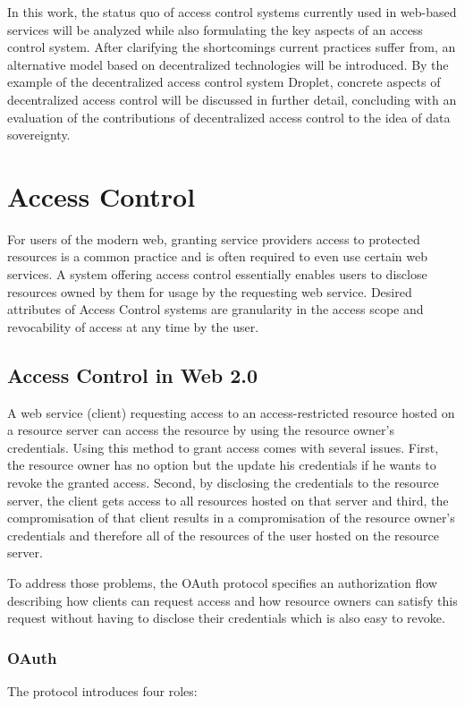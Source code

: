 \documentclass[conference]{IEEEtran}
\begin{document}
In this work, the status quo of access control systems currently used in web-based services will be analyzed while also formulating the key aspects of an access control system.
After clarifying the shortcomings current practices suffer from, an alternative model based on decentralized technologies will be introduced.
By the example of the decentralized access control system Droplet, concrete aspects of decentralized access control will be discussed in further detail, concluding with an evaluation of the contributions of decentralized access control to the idea of data sovereignty.

\section{Access Control}


For users of the modern web, granting service providers access to protected resources is a common practice and is often required to even use certain web services.
A system offering access control essentially enables users to disclose resources owned by them for usage by the requesting web service.
Desired attributes of Access Control systems are granularity in the access scope and revocability of access at any time by the user.

\subsection{Access Control in Web 2.0}
A web service (client) requesting access to an access-restricted resource hosted on a resource server can access the resource by using the resource owner's credentials.
Using this method to grant access comes with several issues.
First, the resource owner has no option but the update his credentials if he wants to revoke the granted access.
Second, by disclosing the credentials to the resource server, the client gets access to all resources hosted on that server and third, the compromisation of that client results in a compromisation of the resource owner's credentials and therefore all of the resources of the user hosted on the resource server.

To address those problems, the OAuth protocol specifies an authorization flow describing how clients can request access and how resource owners can satisfy this request without having to disclose their credentials which is also easy to revoke. \cite{hardt_oauth_2012}

\subsubsection*{OAuth}
The protocol introduces four roles:
\end{document}
